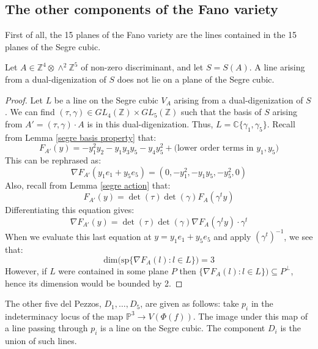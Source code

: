\documentclass{report}
\begin{document}
\subsection{The other components of the Fano variety}

First of all, the 15 planes of the Fano variety are the lines contained in the 15 planes of the Segre cubic.

\begin{lemma} \label{not plane}
Let $A \in \mathbb{Z}^4 \otimes \wedge^2 \mathbb{Z}^5$ of non-zero discriminant, and let $S = S(A)$.  A line arising from a dual-digenization of $S$ does not lie on a plane of the Segre cubic.
\end{lemma}
\begin{proof}
Let $L$ be a line on the Segre cubic $V_A$ arising from a dual-digenization of $S$.  We can find $(\tau, \gamma) \in GL_4(\mathbb{Z}) \times GL_5(\mathbb{Z})$ such that the basis of $S$ arising from $A' = (\tau, \gamma) \cdot A$ is in this dual-digenization.  Thus, $L = \mathbb{C}\{\gamma_1,\gamma_5\}$.  Recall from Lemma \ref{segre basis property} that:
\begin{equation}
F_{A'}(y) = - y_1^2 y_2 - y_1 y_3 y_5 - y_4 y_5^2 + \text{(lower order terms in $y_1, y_5$)}
\end{equation}
This can be rephrased as:
\begin{equation}
\nabla F_{A'}(y_1 e_1 + y_5 e_5) = (0, - y_1^2, - y_1 y_5, - y_5^2, 0)
\end{equation}
Also, recall from Lemma \ref{segre action} that:
\begin{equation}
F_{A'}(y) = \det(\tau) \det(\gamma) F_A(\gamma^t y)
\end{equation}
Differentiating this equation gives:
\begin{equation}
\nabla F_{A'} (y) = \det(\tau) \det(\gamma) \nabla F_A (\gamma^t y) \cdot \gamma^t
\end{equation}
When we evaluate this last equation at $y = y_1 e_1 + y_5 e_5$ and apply $(\gamma^t)^{-1}$, we see that:
\begin{equation}
\text{dim(sp} \{ \nabla F_{A} ( l ) : l \in L \}) = 3
\end{equation}
However, if $L$ were contained in some plane $P$ then $\{ \nabla F_A ( l ) : l \in L \}) \subseteq P^\perp$, hence its dimension would be bounded by 2.
\end{proof}

The other five del Pezzos, $D_1,\ldots,D_5$, are given as follows:  take $p_i$ in the indeterminacy locus of the map $\mathbb{P}^3 \to V(\Phi(f))$.  The image under this map of a line passing through $p_i$ is a line on the Segre cubic.  The component $D_i$ is the union of such lines.
\end{document}
